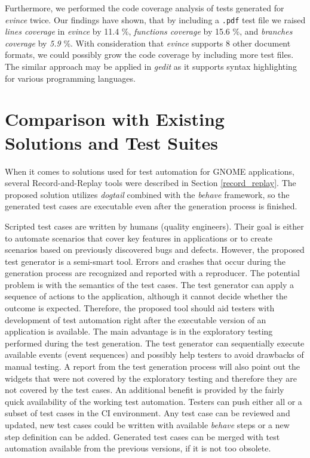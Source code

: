 Furthermore, we performed the code coverage analysis of tests generated for \textit{evince} twice. Our findings have shown, that by including a \texttt {.pdf} test file we raised \textit{lines coverage} in \textit{evince} by 11.4 \%, \textit{functions coverage} by 15.6 \%, and \textit{branches coverage} by \textit{5.9} \%.  With consideration that \textit{evince} supports 8 other document formats, we could possibly grow the code coverage by including more test files. The similar approach may be applied in \textit{gedit} as it supports syntax highlighting for various programming languages.

\section{Comparison with Existing Solutions and Test Suites}\label{comparison_with_existing_tools}
When it comes to solutions used for test automation for GNOME applications, several Record-and-Replay tools were described in Section \ref{record_replay}. The proposed solution utilizes \textit{dogtail} combined with the \textit{behave} framework, so the generated test cases are executable even after the generation process is finished.

Scripted test cases are written by humans (quality engineers). Their goal is either to automate scenarios that cover key features in applications or to create scenarios based on previously discovered bugs and defects. However, the proposed test generator is a semi-smart tool. Errors and crashes that occur during the generation process are recognized and reported with a reproducer. The potential problem is with the semantics of the test cases. The test generator can apply a sequence of actions to the application, although it cannot decide whether the outcome is expected. Therefore, the proposed tool should aid testers with development of test automation right after the executable version of an application is available. The main advantage is in the exploratory testing performed during the test generation. The test generator can sequentially execute available events (event sequences) and possibly help testers to avoid drawbacks of manual testing. A report from the test generation process will also point out the widgets that were not covered by the exploratory testing and therefore they are not covered by the test cases. An additional benefit is provided by the fairly quick availability of the working test automation. Testers can push either all or a subset of test cases in the CI environment. Any test case can be reviewed and updated, new test cases could be written with available \textit{behave} steps or a new step definition can be added. Generated test cases can be merged with test automation available from the previous versions, if it is not too obsolete.

